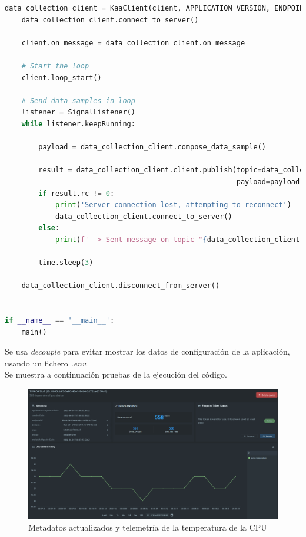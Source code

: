 \begin{lstlisting}[language=Python]
    data_collection_client = KaaClient(client, APPLICATION_VERSION, ENDPOINT_TOKEN, KPC_HOST, KPC_PORT)
    data_collection_client.connect_to_server()

    client.on_message = data_collection_client.on_message

    # Start the loop
    client.loop_start()

    # Send data samples in loop
    listener = SignalListener()
    while listener.keepRunning:

        payload = data_collection_client.compose_data_sample()

        result = data_collection_client.client.publish(topic=data_collection_client.data_collection_topic,
                                                       payload=payload)
        if result.rc != 0:
            print('Server connection lost, attempting to reconnect')
            data_collection_client.connect_to_server()
        else:
            print(f'--> Sent message on topic "{data_collection_client.data_collection_topic}":\n{payload}')

        time.sleep(3)

    data_collection_client.disconnect_from_server()


if __name__ == '__main__':
    main()


\end{lstlisting}

Se usa \textit{decouple} para evitar mostrar los datos de configuración de la aplicación, usando un fichero \textit{.env}. \\

Se muestra a continuación pruebas de la ejecución del código.


\begin{figure}[p]
    \centering
    \includegraphics[width=\linewidth]{imagenes/data-execution.png}
    \caption{Metadatos actualizados y telemetría de la temperatura de la CPU}
    \label{fig:figure13}
\end{figure}

